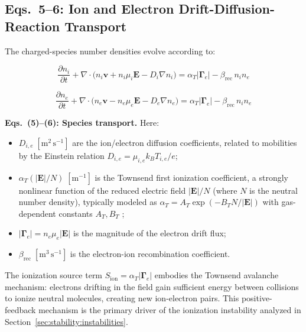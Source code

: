 \documentclass[12pt,twocolumn]{article}
\newcommand{\ee}{\mathbf{E}}
\newcommand{\vv}{\mathbf{v}}
\begin{document}
\subsection{Eqs.~5--6: Ion and Electron Drift-Diffusion-Reaction
  Transport}
\label{sec:theory:species}

The charged-species number densities evolve according to:

\begin{equation}
\boxed{
  \frac{\partial n_i}{\partial t}
  + \nabla \cdot \bigl(
    n_i \vv + n_i \mu_i \ee - D_i \nabla n_i
  \bigr)
  = \alpha_T |\bm{\Gamma}_e| - \beta_{\mathrm{rec}}\, n_i n_e
}
\tag{5}
\label{eq:species_ion}
\end{equation}

\begin{equation}
\boxed{
  \frac{\partial n_e}{\partial t}
  + \nabla \cdot \bigl(
    n_e \vv - n_e \mu_e \ee - D_e \nabla n_e
  \bigr)
  = \alpha_T |\bm{\Gamma}_e| - \beta_{\mathrm{rec}}\, n_i n_e
}
\tag{6}
\label{eq:species_electron}
\end{equation}

\noindent
\textbf{Eqs.~(5)--(6): Species transport.} Here:
\begin{itemize}
  \item $D_{i,e}\;[\mathrm{m^2\,s^{-1}}]$ are the ion/electron
    diffusion coefficients, related to mobilities by the Einstein
    relation $D_{i,e} = \mu_{i,e} k_B T_{i,e} / e$;
  \item $\alpha_T(|\ee|/N)\;[\mathrm{m^{-1}}]$ is the Townsend
    first ionization coefficient, a strongly nonlinear function of
    the reduced electric field $|\ee|/N$ (where $N$ is the neutral
    number density), typically modeled as
    $\alpha_T = A_T \exp(-B_T N / |\ee|)$ with gas-dependent
    constants $A_T, B_T$ \cite{Raizer1991};
  \item $|\bm{\Gamma}_e| = n_e \mu_e |\ee|$ is the magnitude of the
    electron drift flux;
  \item $\beta_{\mathrm{rec}}\;[\mathrm{m^3\,s^{-1}}]$ is the
    electron-ion recombination coefficient.
\end{itemize}

The ionization source term $S_{\mathrm{ion}} = \alpha_T |\bm{\Gamma}_e|$
embodies the Townsend avalanche mechanism: electrons drifting in the
field gain sufficient energy between collisions to ionize neutral
molecules, creating new ion-electron pairs. This positive-feedback
mechanism is the primary driver of the ionization instability
analyzed in Section~\ref{sec:stability:instabilities}.
\end{document}
